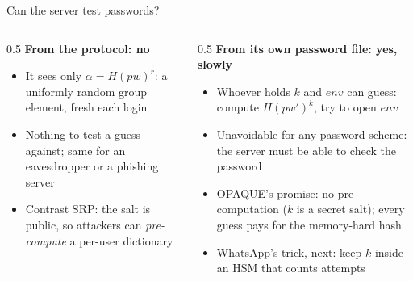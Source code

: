\ifdefined\PRESENTATION\else\PassOptionsToClass{handout}{beamer}\fi\documentclass[aspectratio=169, lualatex]{beamer}
\begin{document}
\begin{frame}{Can the server test passwords?}
	\begin{columns}[c]
		\begin{column}{0.5\textwidth}
			\textbf{From the protocol: no}
			\begin{itemize}
				\item It sees only $\alpha = H(pw)^r$: a uniformly random group element, fresh each login
				\item Nothing to test a guess against; same for an eavesdropper or a phishing server
				\item Contrast SRP: the salt is public, so attackers can \textit{pre-compute} a per-user dictionary
			\end{itemize}
		\end{column}
		\begin{column}{0.5\textwidth}
			\textbf{From its own password file: yes, slowly}
			\begin{itemize}
				\item Whoever holds $k$ and $env$ can guess: compute $H(pw')^k$, try to open $env$
				\item Unavoidable for any password scheme: the server must be able to check the password
				\item OPAQUE's promise: no pre-computation ($k$ is a secret salt); every guess pays for the memory-hard hash
				\item WhatsApp's trick, next: keep $k$ inside an HSM that counts attempts
			\end{itemize}
		\end{column}
	\end{columns}
\end{frame}
\end{document}
